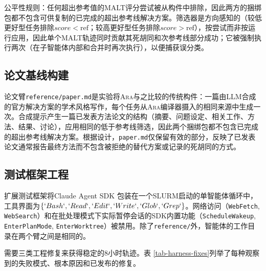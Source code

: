 \documentclass[
]{article}
\newcommand{\passthrough}[1]{#1}
\theoremstyle{definition}
\newcommand{\ara}{\textsc{Ara}}
\begin{document}
公平性规则：任何超出参考值的MALT评分尝试被从构件中排除，因此两方的捆绑包都不包含可供复制的已完成的超出参考线解决方案。筛选器是方向感知的（较低更好型任务排除\(score < \text{ref}\)；较高更好型任务排除\(score > \text{ref}\)），按尝试而非按运行应用，因此单个MALT轨迹同时贡献其死胡同和次参考线部分成功；它被强制执行两次（在子智能体内部和合并时再次执行），以便捕获误分类。

\subsection{论文基线构建}\label{sec-app-extension-paper-baseline}

论文臂\passthrough{\lstinline!reference/paper.md!}是实验将\ara{}与之比较的传统构件：一篇由LLM合成的官方解决方案的学术风格写作，每个任务从\ara{}编译器摄入的相同来源中生成一次。合成提示产生一篇已发表方法论文的结构（摘要、问题设定、相关工作、方法、结果、讨论），应用相同的低于参考线筛选，因此两个捆绑包都不包含已完成的超出参考线解决方案。根据设计，\passthrough{\lstinline!paper.md!}仅保留有效的部分，反映了已发表论文通常报告最终方法而不包含被拒绝的替代方案或记录的死胡同的方式。

\subsection{测试框架工程}\label{sec-app-extension-harness}

扩展测试框架将Claude Agent SDK
\citep{claudecodesdk2025}包装在一个SLURM启动的单智能体循环中，工具界面为\(\{`Bash`, `Read`, `Edit`, `Write`, `Glob`, `Grep`\}\)。网络访问（\passthrough{\lstinline!WebFetch!},
\passthrough{\lstinline!WebSearch!}）和在批处理模式下实际暂停会话的SDK内置功能（\passthrough{\lstinline!ScheduleWakeup!},
\passthrough{\lstinline!EnterPlanMode!},
\passthrough{\lstinline!EnterWorktree!}）被禁用。除了\passthrough{\lstinline!reference/!}外，智能体的工作目录在两个臂之间是相同的。

需要三类工程修复来获得稳定的8小时轨迹。表
\ref{tab-harness-fixes}列举了每种观察到的失败模式、根本原因和已发布的修复。
\end{document}
